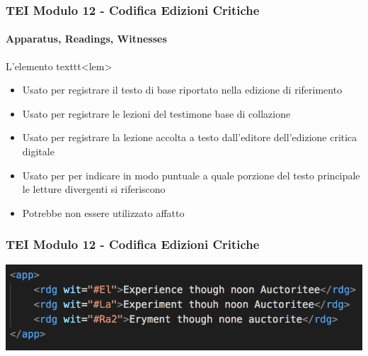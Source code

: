 \begin{frame}
    \frametitle{TEI Modulo 12 - Codifica Edizioni Critiche}
    \framesubtitle{Apparatus, Readings, Witnesses}
    \addtocounter{nframe}{1}





    \begin{block}{L'elemento texttt{<lem>}}
        
        \begin{itemize}
            \item Usato per registrare il testo di base riportato nella edizione di riferimento
            \item Usato per registrare le lezioni del testimone base di collazione
            \item Usato per registrare la lezione accolta a testo dall'editore dell'edizione critica digitale
            \item Usato per per indicare in modo puntuale a quale porzione del testo principale le letture divergenti si riferiscono
            \item Potrebbe non essere utilizzato affatto
        \end{itemize}

    \end{block}

\end{frame}

\begin{frame}
    \frametitle{TEI Modulo 12 - Codifica Edizioni Critiche}
    \addtocounter{nframe}{1}
    

    \begin{center}
        \includegraphics[width=.95\textwidth]{imgs/app-rdg.png}
    \end{center}

\end{frame}


